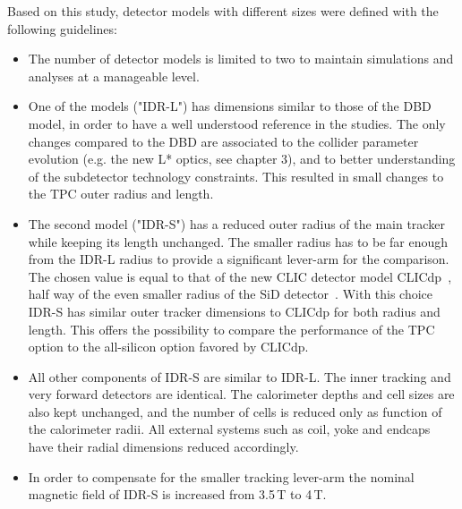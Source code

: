 Based on this study, detector models with different sizes were defined with the following guidelines:

\begin{itemize}
    
\item The number of detector models is limited to two to maintain simulations and analyses at a manageable level.

\item One of the models ("IDR-L") has dimensions similar to those of the DBD model, in order to have a well understood reference in the studies. The only changes compared to the DBD are associated to the collider parameter evolution (e.g. the new L* optics, see chapter 3), and to better understanding of the subdetector technology constraints. This resulted in small changes to the TPC outer radius and length. 

\item The second model ("IDR-S") has a reduced outer radius of the main tracker while keeping its length unchanged. The smaller radius has to be far enough from the IDR-L radius to provide a significant lever-arm for the comparison. The chosen value is equal to that of the new CLIC detector model CLICdp~\cite{Arominski:2018uuz}, half way of the even smaller radius of the SiD detector~\cite{ild:bib:ilddbd}. With this choice IDR-S has similar outer tracker dimensions to CLICdp for both radius and length. This offers the possibility to compare the performance of the TPC option to the all-silicon option favored by CLICdp. 

\item All other components of IDR-S are similar to IDR-L. The inner tracking and very forward detectors are identical. The calorimeter depths and cell sizes are also kept unchanged, and the number of cells is reduced only as function of the calorimeter radii. All external systems such as coil, yoke and endcaps have their radial dimensions reduced accordingly.

\item In order to compensate for the smaller tracking lever-arm the nominal magnetic field of IDR-S is increased from 3.5\,T to 4\,T.

\end{itemize}

